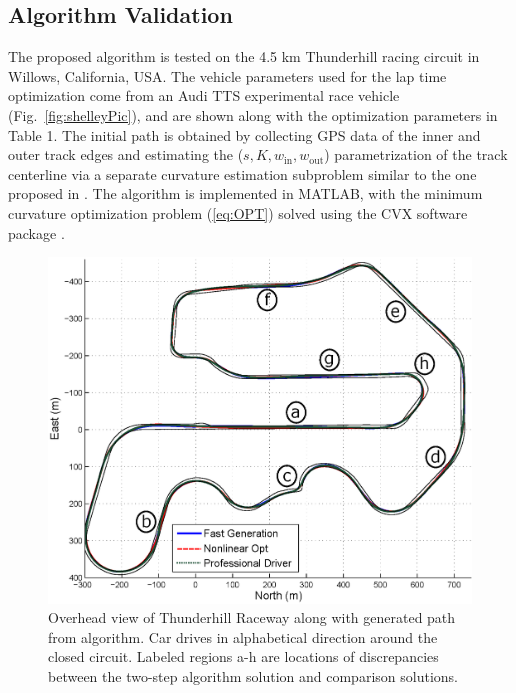 \documentclass[twocolumn,10pt]{asme2ej}
\begin{document}
\subsection{Algorithm Validation}
The proposed algorithm is tested on the 4.5 km Thunderhill racing circuit in Willows, California, USA. The vehicle parameters 
used for the lap time optimization come from an Audi TTS experimental race vehicle (Fig.~\ref{fig:shelleyPic}), and are shown along with the optimization parameters in Table 1.
 The initial path is obtained by collecting GPS data of the inner and outer track edges and estimating the ($s, K, w_\mathrm{in}, w_\mathrm{out}$)
 parametrization of the track centerline via a separate curvature estimation subproblem similar to the one proposed in \cite{perantoni}.
 The algorithm is implemented in MATLAB, with the minimum curvature optimization problem (\ref{eq:OPT}) solved using the CVX software package \cite{boydcvx}.

 \begin{figure}
\centering
\includegraphics[width=4.5in]{figures/racinglines.eps}
\caption{Overhead view of Thunderhill Raceway along with generated path from algorithm. Car drives in alphabetical direction around the closed circuit. Labeled regions a-h are locations of discrepancies between the 
two-step algorithm solution and comparison solutions.}
\label{racingLines}
\end{figure}
\end{document}
